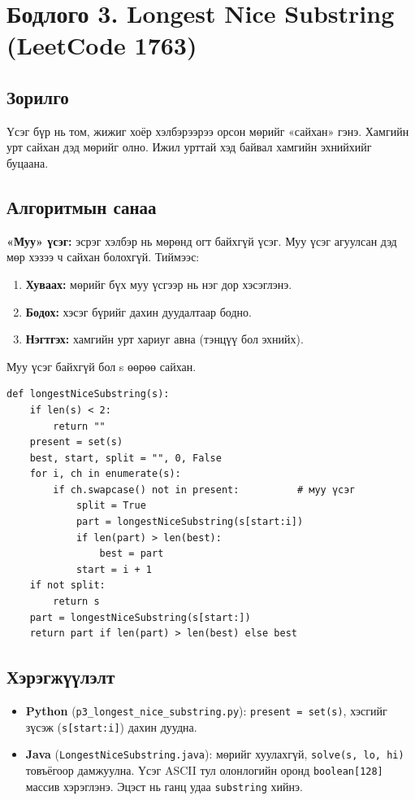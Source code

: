 \documentclass[11pt,a4paper]{article}
\begin{document}
\section{Бодлого 3. Longest Nice Substring (LeetCode 1763)}

\subsection{Зорилго}
Үсэг бүр нь том, жижиг хоёр хэлбэрээрээ орсон мөрийг «сайхан» гэнэ. Хамгийн урт сайхан дэд мөрийг олно. Ижил урттай хэд байвал хамгийн эхнийхийг буцаана.

\subsection{Алгоритмын санаа}
\textbf{«Муу» үсэг:} эсрэг хэлбэр нь мөрөнд огт байхгүй үсэг. Муу үсэг агуулсан дэд мөр хэзээ ч сайхан болохгүй. Тиймээс:
\begin{enumerate}
\item \textbf{Хуваах:} мөрийг бүх муу үсгээр нь нэг дор хэсэглэнэ.
\item \textbf{Бодох:} хэсэг бүрийг дахин дуудалтаар бодно.
\item \textbf{Нэгтгэх:} хамгийн урт хариуг авна (тэнцүү бол эхнийх).
\end{enumerate}

Муу үсэг байхгүй бол s өөрөө сайхан.

\begin{Verbatim}
def longestNiceSubstring(s):
    if len(s) < 2:
        return ""
    present = set(s)
    best, start, split = "", 0, False
    for i, ch in enumerate(s):
        if ch.swapcase() not in present:          # муу үсэг
            split = True
            part = longestNiceSubstring(s[start:i])
            if len(part) > len(best):
                best = part
            start = i + 1
    if not split:
        return s
    part = longestNiceSubstring(s[start:])
    return part if len(part) > len(best) else best
\end{Verbatim}

\subsection{Хэрэгжүүлэлт}
\begin{itemize}
\item \textbf{Python} (\texttt{p3\_\allowbreak{}longest\_\allowbreak{}nice\_\allowbreak{}substring.\allowbreak{}py}): \texttt{present = set(s)}, хэсгийг зүсэж (\texttt{s[start:i]}) дахин дуудна.
\item \textbf{Java} (\texttt{LongestNiceSubstring.\allowbreak{}java}): мөрийг хуулахгүй, \texttt{solve(s, lo, hi)} товъёгоор дамжуулна. Үсэг ASCII тул олонлогийн оронд \texttt{boolean[128]} массив хэрэглэнэ. Эцэст нь ганц удаа \texttt{substring} хийнэ.
\end{itemize}
\end{document}
